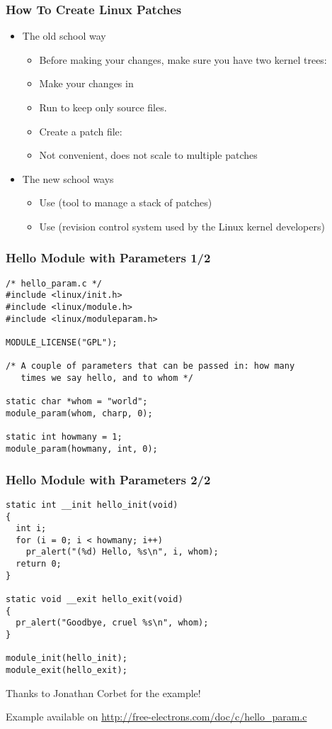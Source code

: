 \begin{frame}
  \frametitle{How To Create Linux Patches}
  \begin{itemize}
  \item The old school way
    \begin{itemize}
    \item Before making your changes, make sure you have two kernel
      trees: 
    \item Make your changes in 
    \item Run  to keep only source files.
    \item Create a patch file:
    \item Not convenient, does not scale to multiple patches
    \end{itemize}
  \item The new school ways
    \begin{itemize}
    \item Use  (tool to manage a stack of patches)
    \item Use  (revision control system used by the Linux kernel
      developers)
    \end{itemize}
  \end{itemize}
\end{frame}

\begin{frame}[fragile]
  \frametitle{Hello Module with Parameters 1/2}
\begin{verbatim}
/* hello_param.c */
#include <linux/init.h>
#include <linux/module.h>
#include <linux/moduleparam.h>

MODULE_LICENSE("GPL");

/* A couple of parameters that can be passed in: how many
   times we say hello, and to whom */

static char *whom = "world";
module_param(whom, charp, 0);

static int howmany = 1;
module_param(howmany, int, 0);

\end{verbatim}
\end{frame}

\begin{frame}[fragile]
  \frametitle{Hello Module with Parameters 2/2}
\begin{verbatim}
static int __init hello_init(void)
{
  int i;
  for (i = 0; i < howmany; i++)
    pr_alert("(%d) Hello, %s\n", i, whom);
  return 0;
}

static void __exit hello_exit(void)
{
  pr_alert("Goodbye, cruel %s\n", whom);
}

module_init(hello_init);
module_exit(hello_exit);
\end{verbatim}
Thanks to Jonathan Corbet for the example!

Example available on \url{http://free-electrons.com/doc/c/hello_param.c}
\end{frame}

